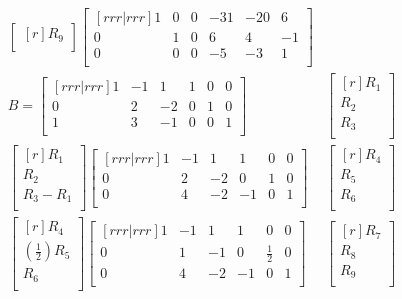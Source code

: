 \documentclass[12pt]{article}
\begin{document}
\begin{enumerate}
\begin{align*}
\begin{bmatrix}[r]
	R_9\\
	\end{bmatrix}
	\begin{bmatrix}[rrr|rrr]
	1 & 0 & 0 & -31 & -20 & 6\\
	0 & 1 & 0 & 6 & 4 & -1\\
	0 & 0 & 0 & -5 & -3 & 1\\
	\end{bmatrix}&\\
	B=
	\begin{bmatrix}[rrr|rrr]
	1 & -1 & 1 & 1 & 0 & 0\\
	0 & 2 & -2 & 0 & 1 & 0\\
	1 & 3 & -1 & 0 & 0 & 1\\
	\end{bmatrix}&
	\begin{bmatrix}[r] R_1\\ R_2\\ R_3\\ \end{bmatrix}\\
	\begin{bmatrix}[r]
	R_1\\
	R_2\\
	R_3 - R_1\\
	\end{bmatrix}
	\begin{bmatrix}[rrr|rrr]
	1 & -1 & 1 & 1 & 0 & 0\\
	0 & 2 & -2 & 0 & 1 & 0\\
	0 & 4 & -2 & -1 & 0 & 1\\
	\end{bmatrix}&
	\begin{bmatrix}[r] R_4\\ R_5\\ R_6\\ \end{bmatrix}\\
	\begin{bmatrix}[r]
	R_4\\
	(\frac{1}{2})R_5\\
	R_6\\
	\end{bmatrix}
	\begin{bmatrix}[rrr|rrr]
	1 & -1 & 1 & 1 & 0 & 0\\
	0 & 1 & -1 & 0 & \frac{1}{2} & 0\\
	0 & 4 & -2 & -1 & 0 & 1\\
	\end{bmatrix}&
	\begin{bmatrix}[r] R_7\\ R_8\\ R_9\\ \end{bmatrix} \\

\end{align*}
\end{enumerate}
\end{document}
